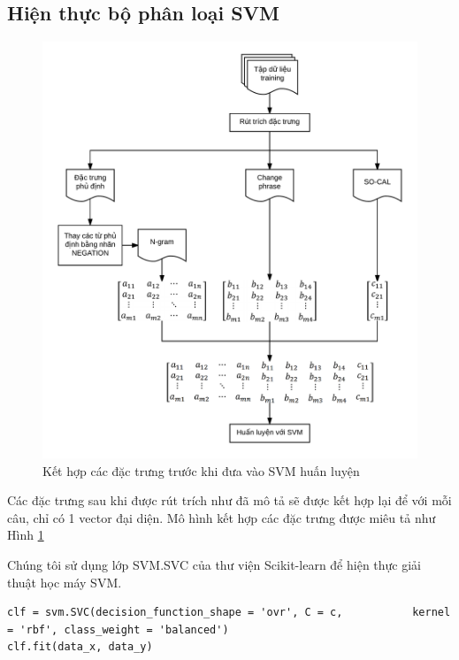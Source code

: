 \subsection{Hiện thực bộ phân loại SVM}
\begin{figure}[H]
\centering
\includegraphics[scale=0.25]{../hinh/kethopdactrung.png}
\caption{Kết hợp các đặc trưng trước khi đưa vào SVM huấn luyện} \label{fig:ket-hop-dac-trung}
\end{figure}
Các đặc trưng sau khi được rút trích như đã mô tả sẽ được kết hợp lại để với mỗi câu, chỉ có 1 vector đại diện. Mô hình kết hợp các đặc trưng được miêu tả như Hình \ref{fig:ket-hop-dac-trung}

Chúng tôi sử dụng lớp SVM.SVC của thư viện Scikit-learn để hiện thực giải thuật học máy SVM.\\
\begin{minipage}{0.95\textwidth}
\begin{lstlisting}
clf = svm.SVC(decision_function_shape = 'ovr', C = c,           kernel = 'rbf', class_weight = 'balanced')
clf.fit(data_x, data_y)
\end{lstlisting}
\end{minipage}

